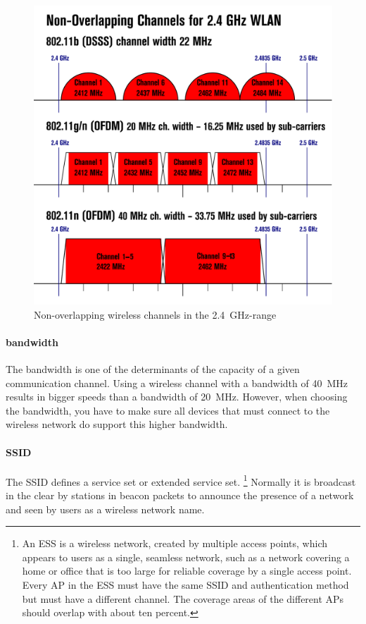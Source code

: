 \begin{figure}
\centering
\includegraphics[width=\textwidth]{images/physical/wifi-channels.png}
\caption{Non-overlapping wireless channels in the \SI{2.4}{\giga\hertz}-range}
\label{fig:wifi-channels}
\end{figure}

\paragraph{bandwidth}
The bandwidth is one of the determinants of the capacity of a given communication channel.
Using a wireless channel with a bandwidth of \SI{40}{\mega\hertz} results in bigger speeds than a bandwidth of \SI{20}{\mega\hertz}.
However, when choosing the bandwidth, you have to make sure all devices that must connect to the wireless network do support this higher bandwidth.

\paragraph{SSID}
The \ac{SSID} defines a service set or extended service set.%
\footnote{%
   An \ac{ESS} is a wireless network, created by multiple access points, which appears to users as a single, seamless network, such as a network covering a home or office that is too large for reliable coverage by a single access point.
   Every \acf{AP} in the \acs{ESS} must have the same \acs{SSID} and authentication method but must have a different channel.
   The coverage areas of the different \aclp{AP} should overlap with about ten percent.
   }
Normally it is broadcast in the clear by stations in beacon packets to announce the presence of a network and seen by users as a wireless network name.

